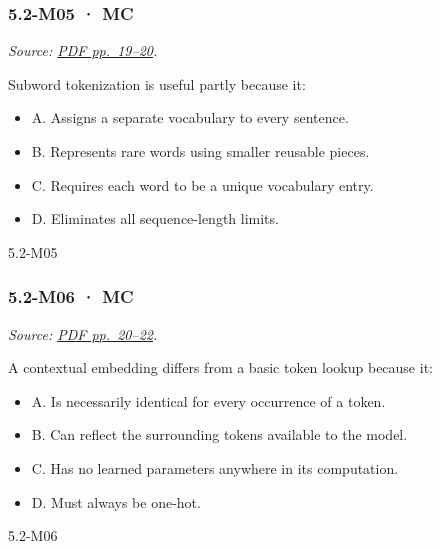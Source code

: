\noindent\begin{minipage}{\linewidth}

\subsubsection{5.2-M05 · MC}\label{m05-mc-13}

\emph{Source:
\href{../Lecture\%20Slides/5.2.\%20Transformers.pdf\#page=19}{PDF
pp.~19--20}.}

Subword tokenization is useful partly because it:

\begin{itemize}
\tightlist
\item
  A. Assigns a separate vocabulary to every sentence.
\item
  B. Represents rare words using smaller reusable pieces.
\item
  C. Requires each word to be a unique vocabulary entry.
\item
  D. Eliminates all sequence-length limits.
\end{itemize}

\begin{solution}[8mm]{5.2-M05}

\end{solution}
\end{minipage}\par\medskip

\noindent\begin{minipage}{\linewidth}

\subsubsection{5.2-M06 · MC}\label{m06-mc-13}

\emph{Source:
\href{../Lecture\%20Slides/5.2.\%20Transformers.pdf\#page=20}{PDF
pp.~20--22}.}

A contextual embedding differs from a basic token lookup because it:

\begin{itemize}
\tightlist
\item
  A. Is necessarily identical for every occurrence of a token.
\item
  B. Can reflect the surrounding tokens available to the model.
\item
  C. Has no learned parameters anywhere in its computation.
\item
  D. Must always be one-hot.
\end{itemize}

\begin{solution}[8mm]{5.2-M06}

\end{solution}
\end{minipage}\par\medskip

